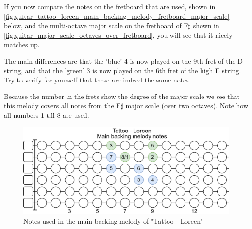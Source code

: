 If you now compare the notes on the fretboard that are used, shown in \autoref{fig:guitar_tattoo_loreen_main_backing_melody_fretboard_major_scale} below, and the multi-octave major scale on the fretboard of F$\sharp$ shown in \autoref{fig:guitar_major_scale_octaves_over_fretboard}, you will see that it nicely matches up.

The main differences are that the 'blue' 4 is now played on the 9th fret of the D string, and that the 'green' 3 is now played on the 6th fret of the high E string. Try to verify for yourself that these are indeed the same notes.

Because the number in the frets show the degree of the major scale we see that this melody covers all notes from the F$\sharp$ major scale (over two octaves). Note how all numbers 1 till 8 are used.

\begin{figure}[h]
	\centering
	\includegraphics[height=0.2\textheight]{../../Images/NotesUsedInMainBackingMelodyTattooLoreen.png}
	\caption{Notes used in the main backing melody of "Tattoo - Loreen"}
	\label{fig:guitar_tattoo_loreen_main_backing_melody_fretboard_major_scale}
\end{figure}

\newpage


